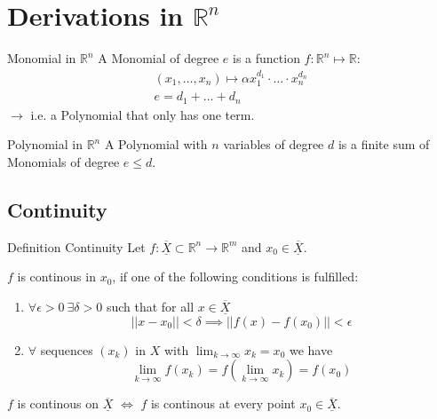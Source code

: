 \documentclass[a4paper,fontsize = 10pt]{article}
\def\R{\mathbb{R}}
\def\X{\underline{\overline{X}}}
\begin{document}
\section{Derivations in \texorpdfstring{\(\R^n\)}{Rⁿ}}
\begin{subbox}{Monomial in $\R^n$}
  A Monomial of degree \(e\) is a function $f: \R^n \mapsto \R:$
  \begin{align*}
    (x_1, \ldots, x_n) \mapsto \alpha x_1^{d_1}\cdot \ldots \cdot x_n^{d_n} \\
    e = d_1 + \ldots + d_n 
  \end{align*}
  \(\to\) i.e. a Polynomial that only has one term.
\end{subbox}
\begin{mainbox}{Polynomial in $\R^n$}
  A Polynomial with \(n\) variables of degree \(d\) is a finite sum of Monomials of degree \(e \le d\).
\end{mainbox}

\subsection{Continuity}
\begin{mainbox}{Definition Continuity}
    Let \(f: \X \subset \R^n \to \R^m\)  and \(x_0 \in \X\). 
    
    \(f\) is continous in \(x_0\), if one of the following conditions is fulfilled:
    \begin{enumerate}
        \item \(\forall \epsilon > 0 \ \exists \delta > 0\) such that for all \(x \in \X\) \[||x - x_0|| < \delta \implies ||f(x) - f(x_0)|| < \epsilon\]
        \item \(\forall\) sequences \((x_k)\) in \(X\) with \(\lim_{k \to \infty} x_k = x_0\) we have \[\lim_{k \to \infty} f(x_k) = f\left(\lim_{k \to \infty} x_k\right) = f(x_0)\]
    \end{enumerate}
\end{mainbox}
\(f\) is continous on \(\X\) $\iff$ \(f\) is continous at every point \(x_0 \in \X\). 
\end{document}
